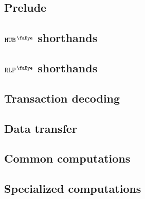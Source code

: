 
\subsection{Prelude}                         \label{user txn data: processing: user: prelude}                        
\subsection{$\isUserTxnHubView$ shorthands}  \label{user txn data: processing: user: hub view shorthands}            
\subsection{$\isUserTxnRlpView$ shorthands}  \label{user txn data: processing: user: rlp view shorthands}            
\subsection{Transaction decoding}            \label{user txn data: processing: user: transaction decoding}           
\subsection{Data transfer}                   \label{user txn data: processing: user: data transafer}                 
\subsection{Common computations}             \label{user txn data: processing: user: common computations}            
\subsection{Specialized computations}        \label{user txn data: processing: user: specialized computations}       
